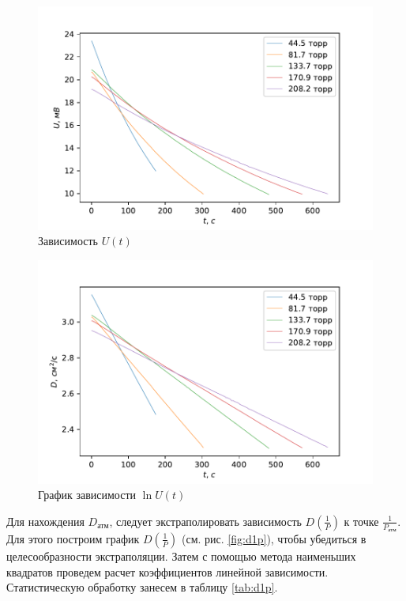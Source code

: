 \documentclass[12pt,a4paper]{article}
\begin{document}
\begin{figure}[H]
	\centering
	\includegraphics[width=1\linewidth]{res/U_T}
	\caption{Зависимость $U(t)$}
	\label{fig:ut}
\end{figure}

\begin{figure}[H]
	\centering
	\includegraphics[width=1\linewidth]{res/lnU_T}
	\caption{График зависимости $\ln{U}(t)$}
	\label{fig:lnut}
\end{figure}


Для нахождения $D_\text{атм}$, следует экстраполировать зависимость $D(\frac{1}{P})$ к точке $\frac{1}{P_\text{атм}}$. Для этого построим график $D(\frac{1}{P})$ (см. рис. \ref{fig:d1p}), чтобы убедиться в целесообразности экстраполяции. Затем с помощью метода наименьших квадратов проведем расчет коэффициентов линейной зависимости. Статистическую обработку занесем в таблицу \ref{tab:d1p}.
\end{document}
